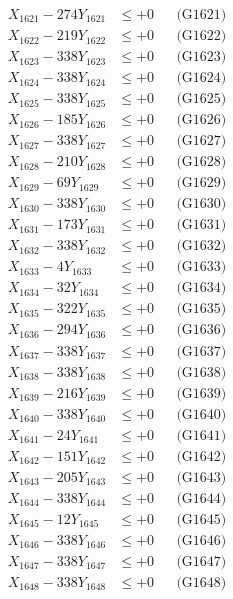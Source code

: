 \documentclass[a4paper,10pt]{article}
\begin{document}
{\begin{align}
\allowbreak
X_{1621} - 274Y_{1621} &\leq +0 && \text{(G1621)} \\
X_{1622} - 219Y_{1622} &\leq +0 && \text{(G1622)} \\
X_{1623} - 338Y_{1623} &\leq +0 && \text{(G1623)} \\
X_{1624} - 338Y_{1624} &\leq +0 && \text{(G1624)} \\
X_{1625} - 338Y_{1625} &\leq +0 && \text{(G1625)} \\
X_{1626} - 185Y_{1626} &\leq +0 && \text{(G1626)} \\
X_{1627} - 338Y_{1627} &\leq +0 && \text{(G1627)} \\
X_{1628} - 210Y_{1628} &\leq +0 && \text{(G1628)} \\
X_{1629} - 69Y_{1629} &\leq +0 && \text{(G1629)} \\
X_{1630} - 338Y_{1630} &\leq +0 && \text{(G1630)} \\
\allowbreak
X_{1631} - 173Y_{1631} &\leq +0 && \text{(G1631)} \\
X_{1632} - 338Y_{1632} &\leq +0 && \text{(G1632)} \\
X_{1633} - 4Y_{1633} &\leq +0 && \text{(G1633)} \\
X_{1634} - 32Y_{1634} &\leq +0 && \text{(G1634)} \\
X_{1635} - 322Y_{1635} &\leq +0 && \text{(G1635)} \\
X_{1636} - 294Y_{1636} &\leq +0 && \text{(G1636)} \\
X_{1637} - 338Y_{1637} &\leq +0 && \text{(G1637)} \\
X_{1638} - 338Y_{1638} &\leq +0 && \text{(G1638)} \\
X_{1639} - 216Y_{1639} &\leq +0 && \text{(G1639)} \\
X_{1640} - 338Y_{1640} &\leq +0 && \text{(G1640)} \\
\allowbreak
X_{1641} - 24Y_{1641} &\leq +0 && \text{(G1641)} \\
X_{1642} - 151Y_{1642} &\leq +0 && \text{(G1642)} \\
X_{1643} - 205Y_{1643} &\leq +0 && \text{(G1643)} \\
X_{1644} - 338Y_{1644} &\leq +0 && \text{(G1644)} \\
X_{1645} - 12Y_{1645} &\leq +0 && \text{(G1645)} \\
X_{1646} - 338Y_{1646} &\leq +0 && \text{(G1646)} \\
X_{1647} - 338Y_{1647} &\leq +0 && \text{(G1647)} \\
X_{1648} - 338Y_{1648} &\leq +0 && \text{(G1648)} \\

\end{align}}
\end{document}
